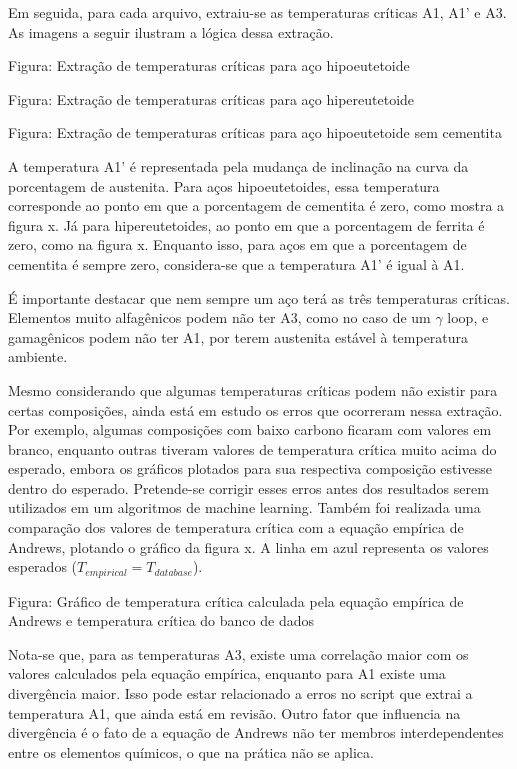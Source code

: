 \documentclass[hidelinks,brazil,dissertacao,epusp]{usp}
\begin{document}
Em seguida, para cada arquivo, extraiu-se as temperaturas críticas A1, A1' e A3. As imagens a seguir ilustram a lógica dessa extração. 


Figura: Extração de temperaturas críticas para aço hipoeutetoide


Figura: Extração de temperaturas críticas para aço hipereutetoide

Figura: Extração de temperaturas críticas para aço hipoeutetoide sem cementita

A temperatura A1' é representada pela mudança de inclinação na curva da porcentagem de austenita. Para aços hipoeutetoides, essa temperatura corresponde ao ponto em que a porcentagem de cementita é zero, como mostra a figura x. Já para hipereutetoides, ao ponto em que a porcentagem de ferrita é zero, como na figura x. Enquanto isso, para aços em que a porcentagem de cementita é sempre zero, considera-se que a temperatura A1' é igual à A1.

É importante destacar que nem sempre um aço terá as três temperaturas críticas. Elementos muito alfagênicos podem não ter A3, como no caso de um $\gamma$ loop, e gamagênicos podem não ter A1, por terem austenita estável à temperatura ambiente.

Mesmo considerando que algumas temperaturas críticas podem não existir para certas composições, ainda está em estudo os erros que ocorreram nessa extração. Por exemplo, algumas composições com baixo carbono ficaram com valores em branco, enquanto outras tiveram valores de temperatura crítica muito acima do esperado, embora os gráficos plotados para sua respectiva composição estivesse dentro do esperado. Pretende-se corrigir esses erros antes dos resultados serem utilizados em um algoritmos de machine learning.
Também foi realizada uma comparação dos valores de temperatura crítica com a equação empírica de Andrews, plotando o gráfico da figura x. A linha em azul representa os valores esperados ($T_{empirical} = T_{database}$).

Figura: Gráfico de temperatura crítica calculada pela equação empírica de Andrews e temperatura crítica do banco de dados  

Nota-se que, para as temperaturas A3, existe uma correlação maior com os valores calculados pela equação empírica, enquanto para A1 existe uma divergência maior. Isso pode estar relacionado a erros no script que extrai a temperatura A1, que ainda está em revisão. Outro fator que influencia na divergência é o fato de a equação de Andrews não ter membros interdependentes entre os elementos químicos, o que na prática não se aplica.
\end{document}
